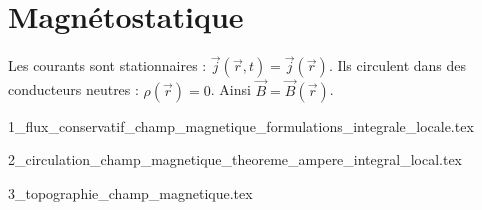 \chapter{Magnétostatique}

Les courants sont stationnaires : $\vec{j}(\vec{r},t)=\vec{j}(\vec{r})$. Ils circulent dans des conducteurs neutres : $\rho(\vec{r})=0$. Ainsi $\vec{B}=\vec{B}(\vec{r})$.

\minitoc

{1_flux_conservatif_champ_magnetique_formulations_integrale_locale.tex}

{2_circulation_champ_magnetique_theoreme_ampere_integral_local.tex}

{3_topographie_champ_magnetique.tex}